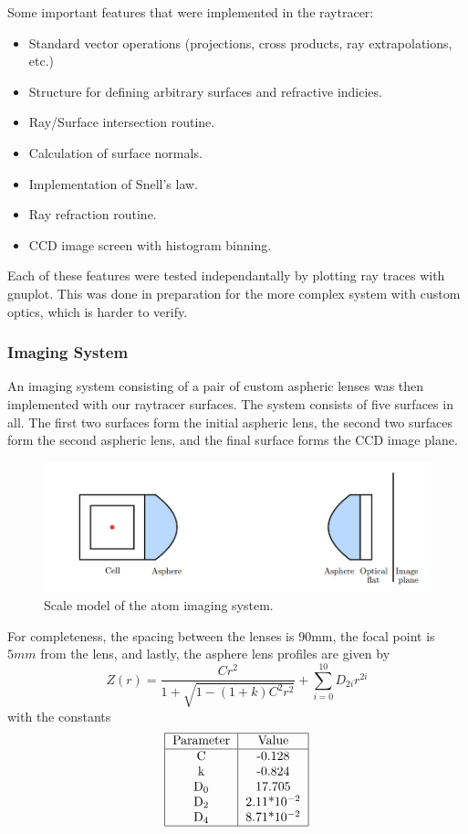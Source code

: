 Some important features that were implemented in the raytracer:
\begin{itemize}
\item Standard vector operations (projections, cross products, ray extrapolations, etc.)
\item Structure for defining arbitrary surfaces and refractive indicies.
\item Ray/Surface intersection routine.
\item Calculation of surface normals.
\item Implementation of Snell's law.
\item Ray refraction routine.
\item CCD image screen with histogram binning.
\end{itemize}
Each of these features were tested independantally by plotting ray traces with gnuplot. This was done in preparation for the more complex system with custom optics, which is harder to verify.

\subsubsection{Imaging System}
An imaging system consisting of a pair of custom aspheric lenses was then implemented with our raytracer surfaces. The system consists of five surfaces in all. The first two surfaces form the initial aspheric lens, the second two surfaces form the second aspheric lens, and the final surface forms the CCD image plane.

\begin{figure}
\includegraphics[scale=0.5]{asphere.png}
\caption{Scale model of the atom imaging system.}
\end{figure}

For completeness, the spacing between the lenses is $90$mm, the focal point is $5mm$ from the lens, and lastly, the asphere lens profiles are given by
\begin{equation}
  Z(r) = \frac{ C r^2}{1 + \sqrt{1-(1+k)C^2r^2}} + \sum_{i=0}^{10}D_{2i}r^{2i}
\end{equation}
with the constants
\begin{equation}
\begin{tabular}{|c|c|}
\hline
\text{Parameter} & \text{Value} \\
\hline
C & -0.128 \\
k & -0.824 \\ 
D$_0$ & 17.705 \\
D$_2$ & 2.11*10$^{-2}$ \\
D$_4$ & 8.71*10$^{-2}$ \\
\hline
\end{tabular}
\end{equation}



